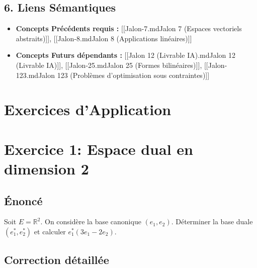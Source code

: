 \hypertarget{liens-suxe9mantiques}{%
\subsection{6. Liens Sémantiques}\label{liens-suxe9mantiques}}

\begin{itemize}
\tightlist
\item
  \textbf{Concepts Précédents requis :} {[}{[}Jalon-7.md\textbar Jalon 7
  (Espaces vectoriels abstraits){]}{]}, {[}{[}Jalon-8.md\textbar Jalon 8
  (Applications linéaires){]}{]}
\item
  \textbf{Concepts Futurs dépendants :} {[}{[}Jalon 12 (Livrable
  IA).md\textbar Jalon 12 (Livrable IA){]}{]},
  {[}{[}Jalon-25.md\textbar Jalon 25 (Formes bilinéaires){]}{]},
  {[}{[}Jalon-123.md\textbar Jalon 123 (Problèmes d'optimisation sous
  contraintes){]}{]}
\end{itemize}

\hypertarget{exercices-dapplication-1}{%
\section{Exercices d'Application}\label{exercices-dapplication-1}}

\hypertarget{exercice-1-espace-dual-en-dimension-2}{%
\section{Exercice 1: Espace dual en dimension
2}\label{exercice-1-espace-dual-en-dimension-2}}

\hypertarget{uxe9noncuxe9}{%
\subsection{Énoncé}\label{uxe9noncuxe9}}

Soit \(E = \mathbb{R}^2\). On considère la base canonique
\((e_1, e_2)\). Déterminer la base duale \((e_1^*, e_2^*)\) et calculer
\(e_1^*(3e_1 - 2e_2)\).

\hypertarget{correction-duxe9tailluxe9e}{%
\subsection{Correction détaillée}\label{correction-duxe9tailluxe9e}}

